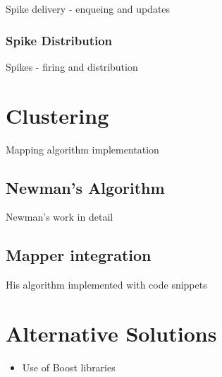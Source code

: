 Spike delivery - enqueing and updates

\subsubsection{Spike Distribution}

Spikes - firing and distribution

\section{Clustering}

Mapping algorithm implementation

\subsection{Newman's Algorithm}

Newman's work in detail

\subsection{Mapper integration}

His algorithm implemented with code snippets

\section{Alternative Solutions}

\begin{itemize}
\item{Use of Boost libraries}
\end{itemize}
